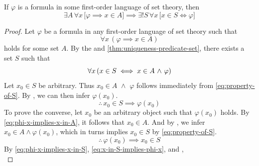 \begin{thm}
    \label{thm:sufficient-condition-for-unrestricted-comprehension}
    If \( \varphi \) is a formula in some first-order language of set theory, then
    \begin{equation*}
        \exists A \, \forall x \, \big[ \varphi \implies x \in A \big]
        \implies
        \exists! S \, \forall x \, \big[ x \in S \iff \varphi \big]
    \end{equation*}
\end{thm}

\begin{proof}
    Let \( \varphi \) be a formula in any first-order language of set theory such that
    \begin{equation}
        \label{eq:phi-x-implies-x-in-A}
        \forall x \, ( \varphi \implies x \in A )
    \end{equation}
    holds for some set \( A \).
    By the  and \cref{thm:uniqueness-predicate-set},
    there exists a set \( S \) such that
    \begin{equation}
        \label{eq:property-of-S}
        \forall x \, \mleft( x \in S \iff x \in A \,\,{\land}\,\, \varphi \mright)
    \end{equation}
    Let \( x_{0} \in S \) be arbitrary. Thus \( x_{0} \in A \,\,{\land}\,\, \varphi \) follows immediately
    from \eqref{eq:property-of-S}.
    By , we can then infer \( \varphi(x_{0}) \).
    \begin{equation}
        \label{eq:x-in-S-implies-phi-x}
        \therefore \, x_{0} \in S \implies \varphi(x_{0})
    \end{equation}
    To prove the converse, let \( x_{0} \) be an arbitrary object such that \( \varphi(x_{0}) \) holds.
    By \eqref{eq:phi-x-implies-x-in-A}, it follows that \( x_{0} \in A \).
    And by , we infer \( x_{0} \in A \land \varphi(x_{0}) \),
    which in turns implies \( x_{0} \in S \) by \eqref{eq:property-of-S}.
    \begin{equation}
        \label{eq:phi-x-implies-x-in-S}
        \therefore \, \varphi(x_{0}) \implies x_{0} \in S
    \end{equation}
    By \eqref{eq:phi-x-implies-x-in-S}, \eqref{eq:x-in-S-implies-phi-x}, and ,
    \begin{equation*}

\end{equation*}
\end{proof}
